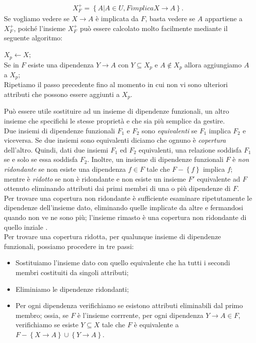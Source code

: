 \documentclass[11pt]{article}
\begin{document}
\begin{eqnarray}
X_F^{+} = \left\{A | A \in U, F implica X \rightarrow A \right\}.
\end{eqnarray}
Se vogliamo vedere se $X \rightarrow A$ è implicata da $F$, basta vedere se $A$ appartiene a $X_F^{+}$, poiché l'insieme $X_F^{+}$ può essere calcolato molto facilmente mediante il seguente algoritmo:
\begin{algorithm}
	\BlankLine
	$X_p \leftarrow X$; \\
	Se in $F$ esiste una dipendenza $Y \rightarrow A$ con $Y \subseteq X_p$ e $A \notin X_p$ allora aggiungiamo $A$ a $X_p$; \\
	Ripetiamo il passo precedente fino al momento in cui non vi sono ulteriori attributi che possono essere aggiunti a $X_p$.
\end{algorithm}
Può essere utile sostituire ad un insieme di dipendenze funzionali, un altro insieme che specifichi le stesse proprietà e che sia più semplice da gestire. \\
Due insiemi di dipendenze funzionali $F_1$ e $F_2$ sono \textit{equivalenti} se $F_1$ implica $F_2$ e viceversa. Se due insiemi sono equivalenti diciamo che ognuno è \textit{copertura} dell'altro. Quindi, dati due insiemi $F_1$ ed $F_2$ equivalenti, una relazione soddisfa $F_1$ se e solo se essa soddisfa $F_2$. Inoltre, un insieme di dipendenze funzionali $F$ è \textit{non ridondante} se non esiste una dipendenza $f \in F$ tale che $F - \left\{f\right\}$ implica $f$; mentre è \textit{ridotto} se non è ridondante e non esiste un insieme $F'$ equivalente ad $F$ ottenuto eliminando attributi dai primi membri di una o più dipendenze di $F$. \\
Per trovare una copertura non ridondante è sufficiente esaminare ripetutamente le dipendenze dell'insieme dato, eliminando quelle implicate da altre e fermandosi quando non ve ne sono più; l'insieme rimasto è una copertura non ridondante di quello inziale  \cite{atzeni1999basi}. \\
Per trovare una copertura ridotta, per qualunque insieme di dipendenze funzionali, possiamo procedere in tre passi:
\begin{itemize}
	\item Sostituiamo l'insieme dato con quello equivalente che ha tutti i secondi membri costituiti da singoli attributi;
	\item Eliminiamo le dipendenze ridondanti;
	\item Per ogni dipendenza verifichiamo se esistono attributi eliminabili dal primo membro; ossia, se $F$ è l'insieme corrrente, per ogni dipendenza $Y \rightarrow A \in F$, verifichiamo se esiste $Y \subseteq X$ tale che $F$ è equivalente a $F - \left\{ X \rightarrow A \right\} \cup \left\{ Y \rightarrow A \right\} $.
\end{itemize}
\end{document}
